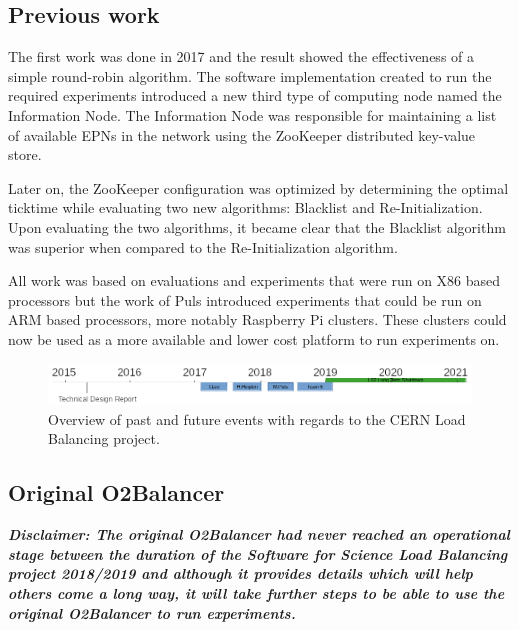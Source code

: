 \documentclass[]{article}
\begin{document}
\subsection*{Previous work}

The first work was done in 2017 and the result showed the effectiveness of a simple round-robin algorithm\cite{vander_2016}. The software implementation created to run the required experiments introduced a new third type of computing node named the Information Node. The Information Node was responsible for maintaining a list of available EPNs in the network using the ZooKeeper distributed key-value store\cite{apache_zookeeper}.

Later on, the ZooKeeper configuration was optimized by determining the optimal ticktime while evaluating two new algorithms: Blacklist and Re-Initialization\cite{vander_2017}. Upon evaluating the two algorithms, it became clear that the Blacklist algorithm was superior when compared to the Re-Initialization algorithm.

All work was based on evaluations and experiments that were run on X86 based processors but the work of Puls introduced experiments that could be run on ARM based processors, more notably Raspberry Pi clusters\cite{mitchel_2018}. These clusters could now be used as a more available and lower cost platform to run experiments on.

\begin{center}
	\begin{figure}[H]
		\includegraphics[width=\textwidth]{images/TimelineProject.png}
		\caption{Overview of past and future events with regards to the CERN Load Balancing project.}
		\label{fig:timeline}
	\end{figure}
\end{center}

\subsection*{Original O2Balancer}
\textit{\textbf{Disclaimer: The original O2Balancer had never reached an operational stage between the duration of the Software for Science Load Balancing project 2018/2019 and although it provides details which will help others come a long way, it will take further steps to be able to use the original O2Balancer to run experiments.}}
\end{document}
